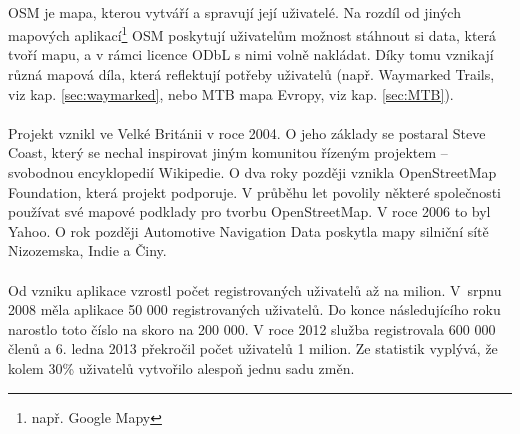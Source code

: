 \documentclass[11pt,a4paper,titlepage,oneside]{book}
\begin{document}

		\paragraph{} \acl{OSM} je mapa, kterou vytváří a spravují její uživatelé. Na rozdíl od jiných mapových aplikací\footnote{např. Google Mapy} \acl{OSM} poskytují uživatelům možnost stáhnout si data, která tvoří mapu, a v rámci licence \ac{ODbL} s nimi volně nakládat. Díky tomu vznikají různá mapová díla, která reflektují potřeby uživatelů (např. Waymarked Trails, viz kap. \ref{sec:waymarked}, nebo MTB mapa Evropy, viz kap. \ref{sec:MTB}). 
		\paragraph{}Projekt vznikl ve Velké Británii v roce 2004. O jeho základy se postaral Steve Coast, který se nechal inspirovat jiným komunitou řízeným projektem -- svobodnou encyklopedií Wikipedie. O dva roky později vznikla OpenStreetMap Foundation, která projekt podporuje. V průběhu let povolily některé společnosti používat své mapové podklady pro tvorbu OpenStreetMap. V roce 2006 to byl Yahoo. O rok později Automotive Navigation Data poskytla mapy silniční sítě Nizozemska, Indie a Činy\cite{osm_wikipedia_en}.
		\paragraph{} Od vzniku aplikace vzrostl počet registrovaných uživatelů až na milion. V~srpnu 2008 měla aplikace 50 000 registrovaných uživatelů. Do konce násle\-dujícího roku narostlo toto číslo na skoro na  200 000. V roce 2012 služba registrovala 600 000 členů a 6. ledna 2013 překročil počet uživatelů 1 milion. Ze statistik vyplývá, že kolem 30\% uživatelů vytvořilo alespoň jednu sadu změn\cite{neis}.

                
\end{document}

